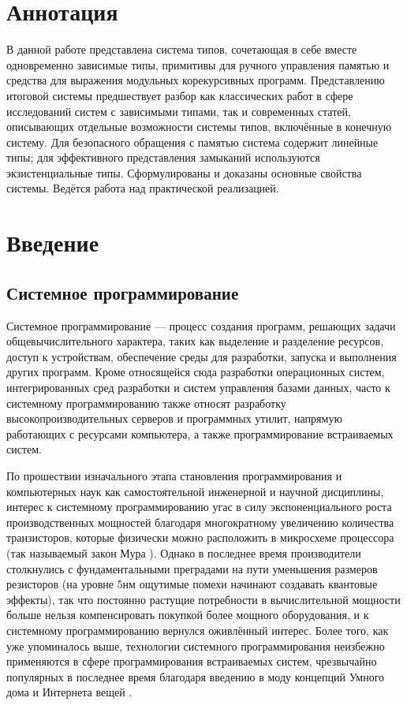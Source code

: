 \documentclass[12pt]{article}
\begin{document}
\setcounter{page}{2}

\section*{Аннотация}

В данной работе представлена система типов, сочетающая в себе вместе
одновременно зависимые типы, примитивы для ручного управления памятью и средства
для выражения модульных корекурсивных программ. Представлению итоговой системы
предшествует разбор как классических работ в сфере исследований систем с
зависимыми типами, так и современных статей, описывающих отдельные возможности
системы типов, включённые в конечную систему. Для безопасного обращения с
памятью система содержит линейные типы; для эффективного представления замыканий
используются экзистенциальные типы. Сформулированы и доказаны основные свойства
системы. Ведётся работа над практической реализацией.

\tableofcontents

\section{Введение}

\subsection{Системное программирование}

Системное программирование --- процесс создания программ, решающих задачи
общевычислительного характера, таких как выделение и разделение ресурсов, доступ
к устройствам, обеспечение среды для разработки, запуска и выполнения других
программ. \cite{wiki:systems} Кроме относящейся сюда разработки операционных
систем, интегрированных сред разработки и систем управления базами данных, часто
к системному программированию также относят разработку высокопроизводительных
серверов и программных утилит, напрямую работающих с ресурсами компьютера, а
также программирование встраиваемых систем. \cite{embedded}

По прошествии изначального этапа становления программирования и компьютерных
наук как самостоятельной инженерной и научной дисциплины, интерес к системному
программированию угас в силу экспоненциального роста производственных мощностей
благодаря многократному увеличению количества транзисторов, которые физически
можно расположить в микросхеме процессора (так называемый закон Мура
\cite{moore}). Однако в последнее время производители столкнулись с
фундаментальными преградами на пути уменьшения размеров резисторов (на уровне
5нм ощутимые помехи начинают создавать квантовые эффекты), так что постоянно
растущие потребности в вычислительной мощности больше нельзя компенсировать
покупкой более мощного оборудования, и к системному программированию вернулся
оживлённый интерес. Более того, как уже упоминалось выше, технологии системного
программирования неизбежно применяются в сфере программирования встраиваемых
систем, чрезвычайно популярных в последнее время благодаря введению в моду
концепций Умного дома \cite{smart-home} и Интернета вещей \cite{iot}.
\end{document}
